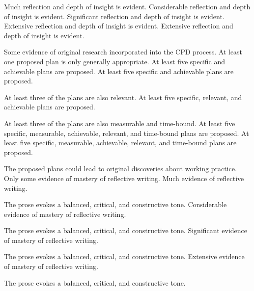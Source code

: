 \documentclass{../../fal_assignment}
\begin{document}
\begin{markingrubric}
        \grade 		Much reflection and depth of insight is evident.
        \grade 		Considerable reflection and depth of insight is evident.
        \grade 		Significant reflection and depth of insight is evident.
        \grade 		Extensive reflection and depth of insight is evident.
        \grade 		Extensive reflection and depth of insight is evident.
        \par 		Some evidence of original research incorporated into the CPD process.
%
        \grade \fail	At least one proposed plan is only generally appropriate. 
        \grade 		At least five specific and achievable plans are proposed. 
        \grade 		At least five specific and achievable plans are proposed. 
        \par 		At least three of the plans are also relevant.
        \grade 		At least five specific, relevant, and achievable plans are proposed. 
        \par 		At least three of the plans are also measurable and time-bound.
        \grade 		At least five specific, measurable, achievable, relevant, and time-bound plans are proposed. 
        \grade 		At least five specific, measurable, achievable, relevant, and time-bound plans are proposed. 
        \par 		The proposed plans could lead to original discoveries about working practice.
%
        \grade 	\fail	Only some evidence of mastery of reflective writing.
        \grade 		Much evidence of reflective writing.
         \par 		The prose evokes a balanced, critical, and constructive tone.
        \grade 		Considerable evidence of mastery of reflective writing.
         \par 		The prose evokes a balanced, critical, and constructive tone.
        \grade 		Significant evidence of mastery of reflective writing.
         \par 		The prose evokes a balanced, critical, and constructive tone.
        \grade 		Extensive evidence of mastery of reflective writing.
         \par 		The prose evokes a balanced, critical, and constructive tone.

\end{markingrubric}
\end{document}
